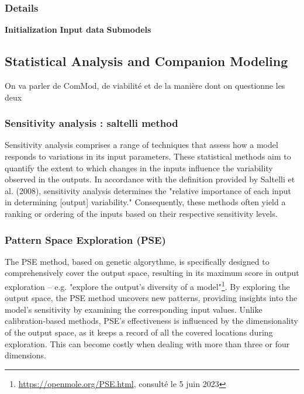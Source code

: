 \documentclass{article}
\begin{document}
    \subsubsection{Details}
        \textbf{Initialization}
        \textbf{Input data}
        \textbf{Submodels}


\subsection{Statistical Analysis and Companion Modeling}

On va parler de ComMod, de viabilité et de la manière dont on questionne les deux

    \subsubsection{Sensitivity analysis : saltelli method}

    Sensitivity analysis comprises a range of techniques that assess how a model responds to variations in its input parameters. These statistical methods aim to quantify the extent to which changes in the inputs influence the variability observed in the outputs. In accordance with the definition provided by Saltelli et al. (2008)\cite{saltelli_global_2008}, sensitivity analysis determines the "relative importance of each input in determining [output] variability." Consequently, these methods often yield a ranking or ordering of the inputs based on their respective sensitivity levels.\\

    \subsubsection{Pattern Space Exploration (PSE)}
    The PSE \cite{cherel_beyond_2015}  method, based on genetic algorythme, is specifically designed to comprehensively cover the output space, resulting in its maximum score in output exploration -- e.g. "explore the output's diversity of a model"\footnote{\url{https://openmole.org/PSE.html}, consulté le 5 juin 2023}. By exploring the output space, the PSE method uncovers new patterns, providing insights into the model's sensitivity by examining the corresponding input values. Unlike calibration-based methods, PSE's effectiveness is influenced by the dimensionality of the output space, as it keeps a record of all the covered locations during exploration. This can become costly when dealing with more than three or four dimensions.
\end{document}
